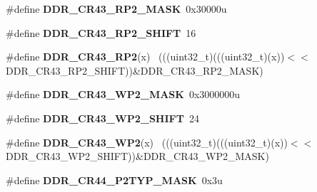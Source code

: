 \begin{DoxyCompactItemize}
\item 
\hypertarget{group___d_d_r___register___masks_ga4db73ccc0bc675d08f34c8ff6abaf029}{}\#define {\bfseries D\+D\+R\+\_\+\+C\+R43\+\_\+\+R\+P2\+\_\+\+M\+A\+S\+K}~0x30000u\label{group___d_d_r___register___masks_ga4db73ccc0bc675d08f34c8ff6abaf029}

\item 
\hypertarget{group___d_d_r___register___masks_ga1fe30f3561473f07c856a981b82c5658}{}\#define {\bfseries D\+D\+R\+\_\+\+C\+R43\+\_\+\+R\+P2\+\_\+\+S\+H\+I\+F\+T}~16\label{group___d_d_r___register___masks_ga1fe30f3561473f07c856a981b82c5658}

\item 
\hypertarget{group___d_d_r___register___masks_ga1958a7ec206991570f2005473ee6529d}{}\#define {\bfseries D\+D\+R\+\_\+\+C\+R43\+\_\+\+R\+P2}(x)                                                ~(((uint32\+\_\+t)(((uint32\+\_\+t)(x))$<$$<$D\+D\+R\+\_\+\+C\+R43\+\_\+\+R\+P2\+\_\+\+S\+H\+I\+F\+T))\&D\+D\+R\+\_\+\+C\+R43\+\_\+\+R\+P2\+\_\+\+M\+A\+S\+K)\label{group___d_d_r___register___masks_ga1958a7ec206991570f2005473ee6529d}

\item 
\hypertarget{group___d_d_r___register___masks_ga2d40175f499db18c06eb99fa8c655ad8}{}\#define {\bfseries D\+D\+R\+\_\+\+C\+R43\+\_\+\+W\+P2\+\_\+\+M\+A\+S\+K}~0x3000000u\label{group___d_d_r___register___masks_ga2d40175f499db18c06eb99fa8c655ad8}

\item 
\hypertarget{group___d_d_r___register___masks_gab35f0437967b809ed3dece103e192e65}{}\#define {\bfseries D\+D\+R\+\_\+\+C\+R43\+\_\+\+W\+P2\+\_\+\+S\+H\+I\+F\+T}~24\label{group___d_d_r___register___masks_gab35f0437967b809ed3dece103e192e65}

\item 
\hypertarget{group___d_d_r___register___masks_ga1e1513e9bed5751349d5638564e1e2e0}{}\#define {\bfseries D\+D\+R\+\_\+\+C\+R43\+\_\+\+W\+P2}(x)                                                ~(((uint32\+\_\+t)(((uint32\+\_\+t)(x))$<$$<$D\+D\+R\+\_\+\+C\+R43\+\_\+\+W\+P2\+\_\+\+S\+H\+I\+F\+T))\&D\+D\+R\+\_\+\+C\+R43\+\_\+\+W\+P2\+\_\+\+M\+A\+S\+K)\label{group___d_d_r___register___masks_ga1e1513e9bed5751349d5638564e1e2e0}

\item 
\hypertarget{group___d_d_r___register___masks_ga3c1d44cb8917e15f4e40fd2fa9e6de76}{}\#define {\bfseries D\+D\+R\+\_\+\+C\+R44\+\_\+\+P2\+T\+Y\+P\+\_\+\+M\+A\+S\+K}~0x3u\label{group___d_d_r___register___masks_ga3c1d44cb8917e15f4e40fd2fa9e6de76}


\end{DoxyCompactItemize}
